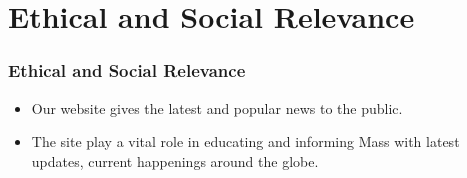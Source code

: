 \section{Ethical and Social Relevance}
\begin{frame}
\frametitle{Ethical and Social Relevance}
\begin{itemize}
	    \item \Large{Our website gives the latest and popular news to the public. }
\end{itemize}
\begin{itemize}
	    \item \Large {The site play a vital role in educating and informing Mass with latest updates, current happenings around the globe.}
\end{itemize}

\end{frame}